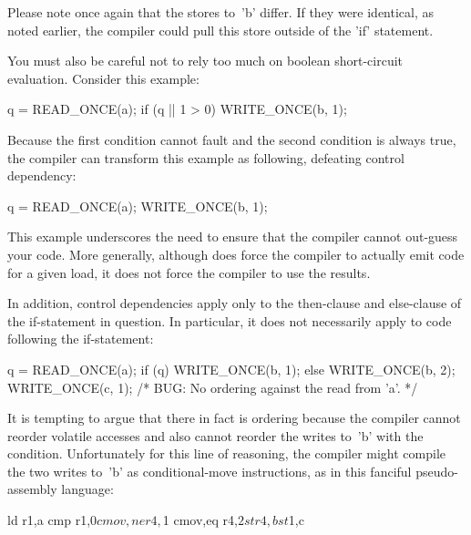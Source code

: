 
Please note once again that the stores to~'b' differ.
If they were identical, as noted earlier, the compiler could pull this
store outside of the 'if' statement.

You must also be careful not to rely too much on boolean short-circuit
evaluation.
Consider this example:

\begin{VerbatimU}
	q = READ_ONCE(a);
	if (q || 1 > 0)
		WRITE_ONCE(b, 1);
\end{VerbatimU}

Because the first condition cannot fault and the second condition is
always true, the compiler can transform this example as following,
defeating control dependency:

\begin{VerbatimU}
	q = READ_ONCE(a);
	WRITE_ONCE(b, 1);
\end{VerbatimU}

This example underscores the need to ensure that the compiler cannot
out-guess your code.  More generally, although  does force
the compiler to actually emit code for a given load, it does not force
the compiler to use the results.

In addition, control dependencies apply only to the then-clause and
else-clause of the if-statement in question.
In particular, it does not necessarily apply to code following the
if-statement:

\begin{VerbatimU}
	q = READ_ONCE(a);
	if (q) {
		WRITE_ONCE(b, 1);
	} else {
		WRITE_ONCE(b, 2);
	}
	WRITE_ONCE(c, 1);  /* BUG: No ordering against the read from 'a'. */
\end{VerbatimU}

It is tempting to argue that there in fact is ordering because the
compiler cannot reorder volatile accesses and also cannot reorder
the writes to~'b' with the condition.
Unfortunately for this line of reasoning, the compiler might compile
the two writes to~'b' as conditional-move instructions, as in this
fanciful pseudo-assembly language:

\begin{VerbatimU}
	ld r1,a
	cmp r1,$0
	cmov,ne r4,$1
	cmov,eq r4,$2
	st r4,b
	st $1,c
\end{VerbatimU}

